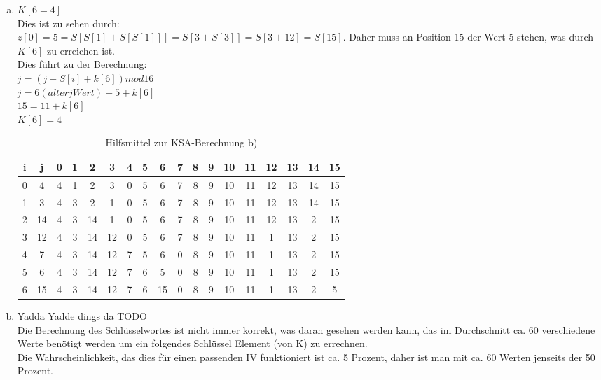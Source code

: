 \documentclass[12pt.twoside,a4paper,notitlepage]{article}
\begin{document}
\begin{enumerate}[a)]
\item $K[6=4]$\\
Dies ist zu sehen durch: \\
$z[0]=5=S[S[1]+S[S[1]]]=S[3+S[3]]=S[3+12]=S[15]$. Daher muss an Position 15 der Wert 5 stehen, was durch $K[6]$ zu 
erreichen ist.\\
Dies führt zu der Berechnung: \\
$j = (j + S[i] + k[6]) mod 16 $\\
$j = 6(alter j Wert) + 5 + k[6]$ \\
$15 = 11 + k[6]$\\
$K[6] = 4 $
\begin{table}[h]
\centering
\begin{tabular}{|c|c||c|c|c|c|c|c|c|c|c|c|c|c|c|c|c|c|}
\hline
i & j & 0 & 1 & 2 & 3 & 4 & 5 & 6 & 7 & 8 & 9 & 10 & 11 & 12 & 13 & 14 & 15 \\
\hline
0 & 4 & 4 & 1 & 2 & 3 & 0 & 5 & 6 & 7 & 8 & 9 & 10 & 11 & 12 & 13 & 14 & 15 \\
\hline
1 & 3 & 4 & 3 & 2 & 1 & 0 & 5 & 6 & 7 & 8 & 9 & 10 & 11 & 12 & 13 & 14 & 15 \\
\hline
2 & 14 & 4 & 3 & 14 & 1 & 0 & 5 & 6 & 7 & 8 & 9 & 10 & 11 & 12 & 13 & 2 & 15 \\
\hline
3 & 12 & 4 & 3 & 14 & 12 & 0 & 5 & 6 & 7 & 8 & 9 & 10 & 11 & 1 & 13 & 2 & 15 \\
\hline
4 & 7 & 4 & 3 & 14 & 12 & 7 & 5 & 6 & 0 & 8 & 9 & 10 & 11 & 1 & 13 & 2 & 15 \\
\hline
5 & 6 & 4 & 3 & 14 & 12 & 7 & 6 & 5 & 0 & 8 & 9 & 10 & 11 & 1 & 13 & 2 & 15 \\
\hline
6 & 15 & 4 & 3 & 14 & 12 & 7 & 6 & 15 & 0 & 8 & 9 & 10 & 11 & 1 & 13 & 2 & 5 \\
\hline
\end{tabular}
\caption{Hilfsmittel zur KSA-Berechnung b)}
\label{tab:ksa}
\end{table}

\item Yadda Yadde dings da TODO\\

Die Berechnung des Schlüsselwortes ist nicht immer korrekt, was daran gesehen werden kann, das im Durchschnitt ca. 60
verschiedene Werte benötigt werden um ein folgendes Schlüssel Element (von K) zu errechnen.\\
Die Wahrscheinlichkeit, das dies für einen passenden IV funktioniert ist ca. 5 Prozent, daher ist man mit ca. 60 Werten jenseits der 50 Prozent.\\

\end{enumerate}
\end{document}

